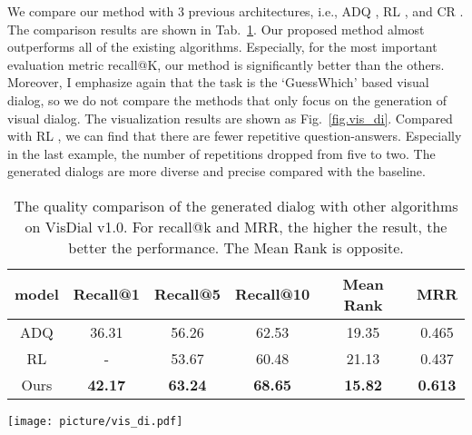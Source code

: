 \documentclass[review]{elsarticle}
\begin{document}
	We compare our method with 3 previous architectures, i.e., ADQ \cite{DBLP:conf/emnlp/MurahariCBPD19}, RL \cite{DBLP:conf/iccv/DasKMLB17}, and CR \cite{DBLP:conf/atal/AgarwalGSLS19}. 
	The comparison results are shown in Tab.~\ref{Tab1}. Our proposed method almost outperforms all of the existing algorithms. Especially, for the most important evaluation metric recall@K, our method is significantly better than the others.   
	Moreover, I emphasize again that the task is the `GuessWhich' based visual dialog, so we do not compare the methods that only focus on the generation of visual dialog.
	The visualization results are shown as Fig.~\ref{fig.vis_di}. Compared with RL \cite{DBLP:conf/iccv/DasKMLB17}, we can find that there are fewer repetitive question-answers. Especially in the last example, the number of repetitions dropped from five to two. The generated dialogs are more diverse and precise compared with the baseline.
	\begin{table}[]
		\centering
		\label{my-label}
			\begin{tabular}{|c|c|c|c|c|c|}
				\hline
				model    & Recall@1 & Recall@5 & Recall@10 & Mean Rank & MRR   \\ \hline
				ADQ \cite{DBLP:conf/emnlp/MurahariCBPD19}      & 36.31    & 56.26    & 62.53     & 19.35     & 0.465 \\ \hline
				RL \cite{DBLP:conf/iccv/DasKMLB17}             & -         & 53.67    & 60.48     & 21.13     & 0.437 \\ \hline
				Ours                              & \textbf{42.17}    & \textbf{63.24}    & \textbf{68.65}     & \textbf{15.82}     & \textbf{0.613} \\ \hline
			\end{tabular}
		\caption{The quality comparison of the generated dialog with other algorithms on VisDial v1.0. For recall@k and MRR, the higher the result, the better the performance. The Mean Rank is opposite. }
		\label{Tab1}
	\end{table}
	
	\begin{figure*}[ht]
		\centering
		\texttt{[image: picture/vis\_di.pdf]}
		\centering 
		\caption{The qualitative results of our method for visual dialog.} 
		\label{fig.vis_di}
	\end{figure*}	
	
\end{document}
